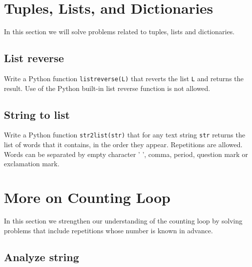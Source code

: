 
\section{Tuples, Lists, and Dictionaries}

In this section we will solve problems related to tuples, lists and dictionaries. 


\subsection{List reverse}

Write a Python function {\tt listreverse(L)} that reverts the list {\tt L} and 
returns the result. Use of the Python built-in list reverse function is not allowed. 


\subsection{String to list}

Write a Python function {\tt str2list(str)} that for any text string {\tt str} 
returns the list of words that it contains, in the order they appear. Repetitions 
are allowed. Words can be separated by empty character  ' ', comma, period, 
question mark or exclamation mark.


\section{More on Counting Loop} 

In this section we strengthen our understanding of the counting 
loop by solving problems that include repetitions whose number 
is known in advance.


\subsection{Analyze string}

